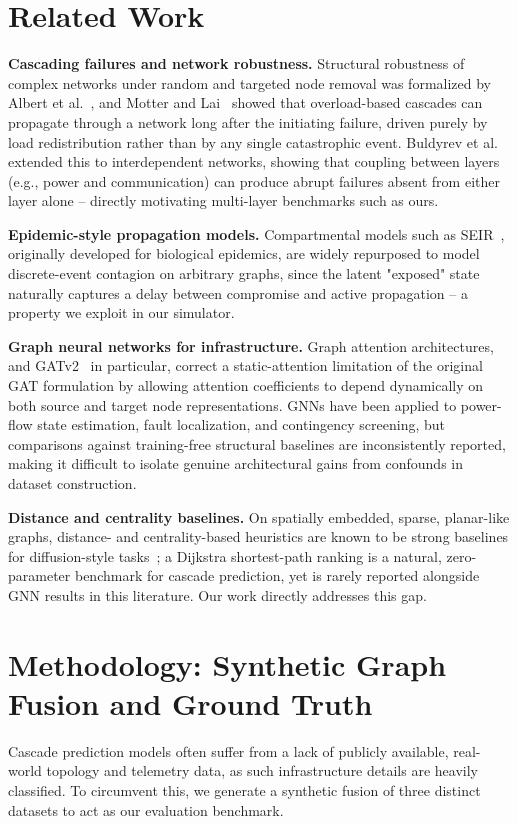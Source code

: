 \documentclass[10pt]{article}
\begin{document}
\section{Related Work}
\textbf{Cascading failures and network robustness.} Structural robustness of complex networks under random and targeted node removal was formalized by Albert et al.~\cite{albert2000error}, and Motter and Lai~\cite{motter2002cascade} showed that overload-based cascades can propagate through a network long after the initiating failure, driven purely by load redistribution rather than by any single catastrophic event. Buldyrev et al.~\cite{buldyrev2010catastrophic} extended this to interdependent networks, showing that coupling between layers (e.g., power and communication) can produce abrupt failures absent from either layer alone -- directly motivating multi-layer benchmarks such as ours.

\textbf{Epidemic-style propagation models.} Compartmental models such as SEIR~\cite{kermack1927contribution}, originally developed for biological epidemics, are widely repurposed to model discrete-event contagion on arbitrary graphs, since the latent "exposed" state naturally captures a delay between compromise and active propagation -- a property we exploit in our simulator.

\textbf{Graph neural networks for infrastructure.} Graph attention architectures, and GATv2~\cite{brody2022how} in particular, correct a static-attention limitation of the original GAT formulation by allowing attention coefficients to depend dynamically on both source and target node representations. GNNs have been applied to power-flow state estimation, fault localization, and contingency screening, but comparisons against training-free structural baselines are inconsistently reported, making it difficult to isolate genuine architectural gains from confounds in dataset construction.

\textbf{Distance and centrality baselines.} On spatially embedded, sparse, planar-like graphs, distance- and centrality-based heuristics are known to be strong baselines for diffusion-style tasks~\cite{newman2010networks}; a Dijkstra shortest-path ranking is a natural, zero-parameter benchmark for cascade prediction, yet is rarely reported alongside GNN results in this literature. Our work directly addresses this gap.

\section{Methodology: Synthetic Graph Fusion and Ground Truth}
Cascade prediction models often suffer from a lack of publicly available, real-world topology and telemetry data, as such infrastructure details are heavily classified. To circumvent this, we generate a synthetic fusion of three distinct datasets to act as our evaluation benchmark.
\end{document}
